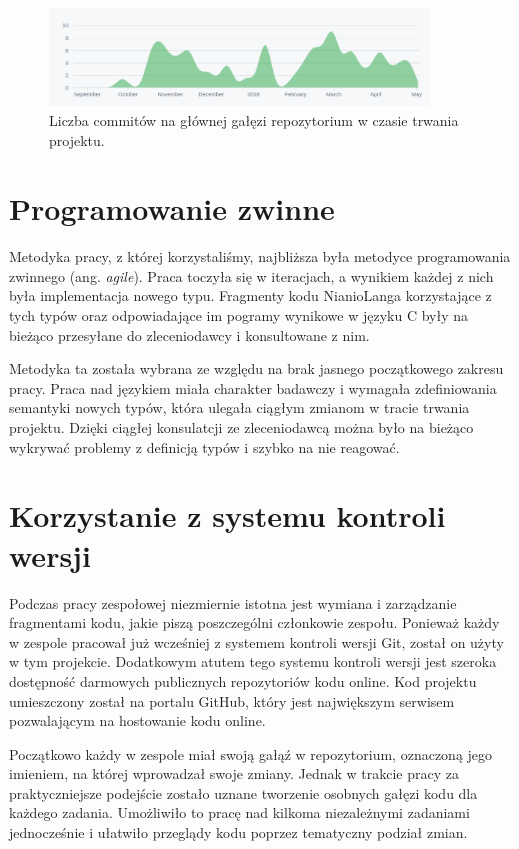 \documentclass[licencjacka]{pracamgr}
\begin{document}
\begin{figure}[h]
  \centering
  \includegraphics[width=0.9\textwidth]{files/commits_over_time}
  \caption{Liczba commitów na głównej gałęzi repozytorium w czasie trwania projektu.}
  \label{img:commits_over_time}
\end{figure}

\section{Programowanie zwinne}
Metodyka pracy, z której korzystaliśmy, najbliższa była metodyce programowania zwinnego (ang. \textit{agile}).
Praca toczyła się w iteracjach, a wynikiem każdej z nich była implementacja nowego typu.
Fragmenty kodu NianioLanga korzystające z tych typów oraz odpowiadające im pogramy wynikowe w języku
C były na bieżąco przesyłane do zleceniodawcy i konsultowane z nim.

Metodyka ta została wybrana ze względu na brak jasnego początkowego zakresu pracy.
Praca nad językiem miała charakter badawczy i wymagała zdefiniowania semantyki nowych typów,
która ulegała ciągłym zmianom w tracie trwania projektu.
Dzięki ciągłej konsulatcji ze zleceniodawcą można było na bieżąco wykrywać problemy z definicją typów
i szybko na nie reagować.


\section{Korzystanie z systemu kontroli wersji}
Podczas pracy zespołowej niezmiernie istotna jest wymiana i zarządzanie fragmentami kodu,
jakie piszą poszczególni członkowie zespołu. Ponieważ każdy w zespole pracował już
wcześniej z systemem kontroli wersji Git, został on użyty w tym projekcie.
Dodatkowym atutem tego systemu kontroli wersji jest szeroka dostępność darmowych
publicznych repozytoriów kodu online. Kod projektu umieszczony został na portalu
GitHub, który jest największym serwisem pozwalającym na hostowanie kodu online.

Początkowo każdy w zespole miał swoją gałąź w repozytorium, oznaczoną jego imieniem,
na której wprowadzał swoje zmiany. Jednak w trakcie pracy za praktyczniejsze podejście
zostało uznane tworzenie osobnych gałęzi kodu dla każdego zadania.
Umożliwiło to pracę nad kilkoma niezależnymi zadaniami jednocześnie i ułatwiło
przeglądy kodu poprzez tematyczny podział zmian.
\end{document}
